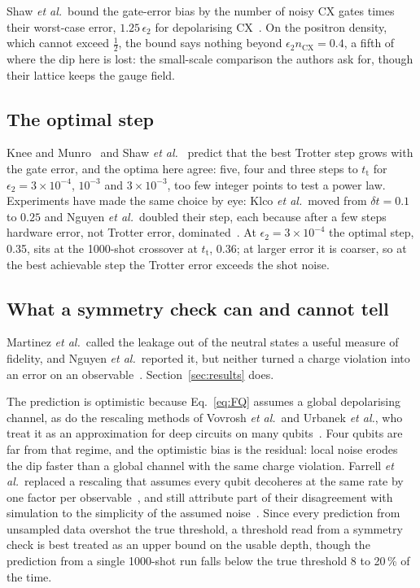 Shaw \emph{et al.}\ bound the gate-error bias by the number of noisy CX gates
times their worst-case error, $1.25\,\epsilon_2$ for depolarising
CX~\cite{shaw2020}. On the positron density, which cannot exceed $\tfrac12$,
the bound says nothing beyond $\epsilon_2 n_{\mathrm{CX}} = 0.4$, a fifth of
where the dip here is lost: the small-scale comparison the authors ask for,
though their lattice keeps the gauge field.

\subsection{The optimal step}

Knee and Munro~\cite{knee2015} and Shaw \emph{et al.}~\cite{shaw2020} predict
that the best Trotter step grows with the gate error, and the optima here agree:
five, four and three steps to $t_{\mathrm{t}}$ for $\epsilon_2 =
3\times10^{-4}$, $10^{-3}$ and $3\times10^{-3}$, too few integer points to test
a power law. Experiments have made the same choice by eye: Klco \emph{et al.}\
moved from $\delta t = 0.1$ to $0.25$ and Nguyen \emph{et al.}\ doubled their
step, each because after a few steps hardware error, not Trotter error,
dominated~\cite{klco2018,nguyen2022}. At $\epsilon_2 = 3\times10^{-4}$ the
optimal step, 0.35, sits at the 1000-shot crossover at $t_{\mathrm{t}}$, 0.36;
at larger error it is coarser, so at the best achievable step the Trotter error
exceeds the shot noise.

\subsection{What a symmetry check can and cannot tell}

Martinez \emph{et al.}\ called the leakage out of the neutral states a useful
measure of fidelity, and Nguyen \emph{et al.}\ reported it, but neither turned a
charge violation into an error on an observable~\cite{martinez2016,nguyen2022}.
Section~\ref{sec:results} does.

The prediction is optimistic because Eq.~\eqref{eq:FQ} assumes a global
depolarising channel, as do the rescaling methods of Vovrosh \emph{et al.}\ and
Urbanek \emph{et al.}, who treat it as an approximation for deep circuits on
many qubits~\cite{vovrosh2021,urbanek2021}. Four qubits are far from that
regime, and the optimistic bias is the residual: local noise erodes the dip
faster than a global channel with the same charge violation. Farrell \emph{et
al.}\ replaced a rescaling that assumes every qubit decoheres at the same rate
by one factor per observable~\cite{farrell2024}, and still attribute part of
their disagreement with simulation to the simplicity of the assumed
noise~\cite{farrell2024b}. Since every prediction from unsampled
data overshot the true threshold, a threshold read from a symmetry check is best
treated as an upper bound on the usable depth, though the prediction from a
single 1000-shot run falls below the true threshold 8 to 20\,\% of the time.

